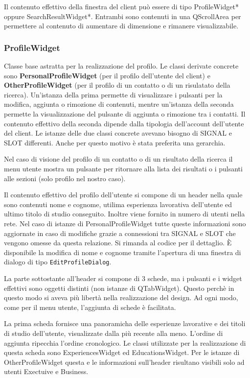 \documentclass[a4paper]{article}
\begin{document}
Il contenuto effettivo della finestra del client può essere di tipo ProfileWidget* oppure SearchResultWidget*. Entrambi sono contenuti in una QScrollArea per permettere al contenuto di aumentare di dimensione e rimanere visualizzabile.

\subsubsection*{ProfileWidget}
Classe base astratta per la realizzazione del profilo. Le classi derivate concrete sono \textbf{PersonalProfileWidget} (per il profilo dell'utente del client) e \textbf{OtherProfileWidget} (per il profilo di un contatto o di un risulatato della ricerca). Un'istanza della prima permette di visualizzare i pulsanti per la modifica, aggiunta o rimozione di contenuti, mentre un'istanza della seconda permette la visualizzazione del pulsante di aggiunta o rimozione tra i contatti. Il contenuto effettivo della seconda dipende dalla tipologia dell'account dell'utente del client. Le istanze delle due classi concrete avevano bisogno di SIGNAL e SLOT differenti. Anche per questo motivo è stata preferita una gerarchia.

Nel caso di visione del profilo di un contatto o di un risultato della ricerca il menu utente mostra un pulsante per ritornare alla lista dei risultati o i pulsanti alle sezioni (solo profilo nel nostro caso).

Il contenuto effettivo del profilo dell'utente si compone di un header nella quale sono contenuti nome e cognome, utilima esperienza lavorativa dell'utente ed ultimo titolo di studio conseguito. Inoltre viene fornito in numero di utenti nella rete. Nel caso di istanze di PersonalProfileWidget tutte queste informazioni sono aggiornate in caso di modifiche grazie a connessioni tra SIGNAL e SLOT che vengono omesse da questa relazione. Si rimanda al codice per il dettaglio. È disponibile la modifica di nome e cognome tramite l'apertura di una finestra di dialogo di tipo \texttt{EditProfileDialog}.

La parte sottostante all'header si compone di 3 schede, ma i pulsanti e i widget effettivi sono oggetti distinti (non istanze di QTabWidget). Questo perchè in questo modo si aveva più libertà nella realizzazione del design. Ad ogni modo, come per il menu utente, l'aggiunta di schede è facilitata. 

La prima scheda fornisce una panoramicha delle esperienze lavorative e dei titoli di studio dell'utente, visualizzate dalla più recente alla meno. L'ordine di aggiunta ripecchia l'ordine cronologico. Le classi utilizzate per la realizzazione di questa scheda sono ExperiencesWidget ed EducationsWidget. Per le istanze di OtherProfileWidget questa e le informazioni sull'header risultano visibili solo ad utenti Exectuive e Business.
\end{document}

